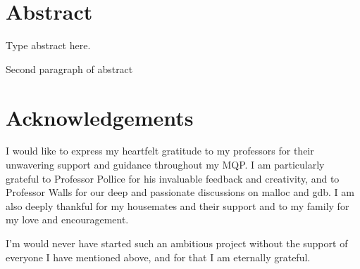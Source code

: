 
\newpage %
\setcounter{page}{1} %

\section*{Abstract} %

\noindent Type abstract here. %
\par Second paragraph of abstract %

\newpage %
\section*{Acknowledgements} %
I would like to express my heartfelt gratitude to my professors for their unwavering support and guidance throughout my MQP. I am particularly grateful to Professor Pollice for his invaluable feedback and creativity, and to Professor Walls for our deep and passionate discussions on malloc and gdb. I am also deeply thankful for my housemates and their support and to my family for my love and encouragement.

I'm would never have started such an ambitious project without the support of everyone I have mentioned above, and for that I am eternally grateful. 


\newpage %
\tableofcontents %
\listoftables %
\listoffigures %

